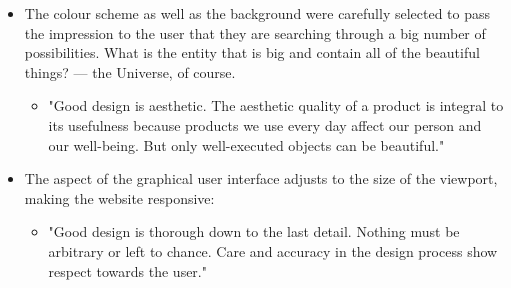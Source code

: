\begin{itemize}
\begin{itemize}
    \end{itemize}
    \item The colour scheme as well as the background were carefully selected to pass the impression to the user that they are searching through a big number of possibilities. What is the entity that is big and contain all of the beautiful things? — the Universe, of course.
    \begin{itemize}
        \item "Good design is aesthetic. The aesthetic quality of a product is integral to its usefulness because products we use every day affect our person and our well-being. But only well-executed objects can be beautiful." \citep{domingo:designprinciples}
    \end{itemize}
    \item The aspect of the graphical user interface adjusts to the size of the viewport, making the website responsive:
    \begin{itemize}
        \item "Good design is thorough down to the last detail. Nothing must be arbitrary or left to chance. Care and accuracy in the design process show respect towards the user." \citep{domingo:designprinciples}
    \end{itemize}
\end{itemize}

